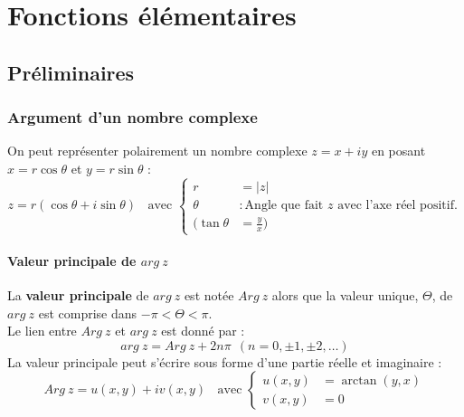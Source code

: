 
\chapter{Fonctions élémentaires}
\label{chap:2}
\section{Préliminaires}
    \subsection{Argument d'un nombre complexe}
    On peut représenter polairement un nombre complexe $z = x+iy$ en posant $x=r\cos\theta$ et $y =
    r\sin\theta$ :
    \begin{equation}
    z = r(\cos\theta + i\sin\theta)\ \ \ \ \text{avec }\left\{\begin{array}{ll}
    r &= |z| \\
    \theta &: \text{Angle que fait $z$ avec l'axe réel positif.}\\
    (\tan\theta &= \frac{y}{x})
    \end{array}\right.
    \end{equation}
    
        \subsubsection{Valeur principale de $arg\ z$}
        La \textbf{valeur principale }de $arg\ z$ est notée $Arg\ z$ alors que la valeur unique,
        $\Theta$, de $arg\ z$ est comprise dans $-\pi < \Theta <\pi$.\\ 
        
        Le lien entre $Arg\ z$ et $arg\ z$ est donné par :
        \begin{equation}
        arg\ z = Arg\ z + 2n\pi\ \ (n = 0,\pm 1, \pm 2, \dots)
        \end{equation}
        La valeur principale peut s'écrire sous forme d'une partie réelle et imaginaire :
        \begin{equation}
        Arg\ z = u(x,y) + iv(x,y)\ \ \ \ \text{avec } \left\{\begin{array}{ll}
        u(x,y) &= \arctan(y,x)  \\
        v(x,y) &= 0 
        \end{array}\right.
        \end{equation}
        
